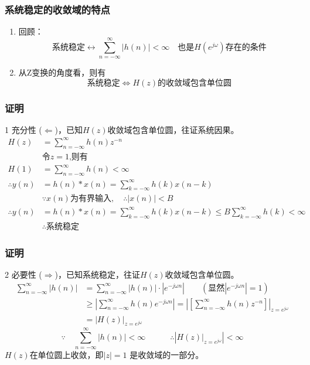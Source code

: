 \documentclass[notheorems,compress,mathserif,table]{beamer}
\begin{document}
\begin{frame}[allowframebreaks]\frametitle{系统稳定的收敛域的特点}%

\begin{enumerate}
\item   回顾：
$$\mbox{系统稳定}\longleftrightarrow  \sum_{n=-\infty}^{\infty}|h(n)|<\infty
\quad\mbox{也是$H(e^{j\omega})$存在的条件}$$
\item 从Z变换的角度看，则有
$$\mbox{系统稳定}\Longleftrightarrow  H(z)\mbox{的收敛域包含单位圆}$$

\end{enumerate}
\end{frame}



\begin{frame}[shrink]\frametitle{证明}%

1 充分性 \quad($\Longleftarrow$)，已知$H(z)$收敛域包含单位圆，往证系统因果。
\begin{equation*}
\begin{split}
H(z) &=  \sum_{n=-\infty}^{\infty}h(n)z^{-n}\\
&   \mbox{令$z=1$,则有} \\
H(1) &=  \sum_{n=-\infty}^{\infty}h(n)  < \infty\\
\therefore
y(n) &= h(n)*x(n) = \sum_{k=-\infty}^{\infty}h(k)x(n-k)\\
& \because x(n)\mbox{为有界输入},\quad\therefore |x(n)|<B \\
\therefore
y(n) &= h(n)*x(n) = \sum_{k=-\infty}^{\infty}h(k)x(n-k)\leqslant B\sum_{k=-\infty}^{\infty}h(k)<\infty\\
&  \therefore \mbox{系统稳定}
\end{split}
\end{equation*}
\end{frame}

\begin{frame}[shrink]\frametitle{证明}%
2 必要性 \quad($\Longrightarrow$)，已知系统稳定，往证$H(z)$收敛域包含单位圆。
\begin{equation*}
\begin{split}
\sum_{n=-\infty}^{\infty}|h(n)|
&= \sum_{n=-\infty}^{\infty}|h(n)|\cdot|e^{-j\omega n}|\quad\quad(\mbox{显然$|e^{-j\omega n}|=1$})\\
&\geqslant \left|\sum_{n=-\infty}^{\infty}h(n)e^{-j\omega n}\right| =
\left|\left[\sum_{n=-\infty}^{\infty}h(n)z^{-n}\right]\right|_{z=e^{j\omega}}\\
&= \left|H(z)\right|_{z=e^{j\omega}}
\end{split}
\end{equation*}
$$\because \quad\sum_{n=-\infty}^{\infty}|h(n)| <\infty
\quad\quad\quad\therefore \left|H(z)|_{z=e^{j\omega}}\right|<\infty$$
$H(z)$在单位圆上收敛，即$|z|=1$ 是收敛域的一部分。
\end{frame}
\end{document}
